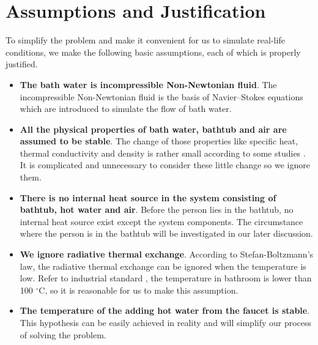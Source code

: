 \documentclass{mcmthesis}
\begin{document}
\section{Assumptions and Justification}

To simplify the problem and make it convenient for us to simulate real-life conditions, we make the following basic assumptions, each of which is properly justified.

\begin{itemize}[leftmargin=*]
\item {\bf The bath water is incompressible Non-Newtonian fluid}. The incompressible Non-Newtonian fluid is the basis of Navier–Stokes equations which are introduced to simulate the flow of bath water.

\item {\bf All the physical properties of bath water, bathtub and air are assumed to be stable}. The change of those properties like specific heat, thermal conductivity and density is rather small according to some studies . It is complicated and unnecessary to consider these little change so we ignore them.

\item {\bf There is no internal heat source in the system consisting of bathtub, hot water and air}. Before the person lies in the bathtub, no internal heat source exist except the system components. The circumstance where the person is in the bathtub will be investigated in our later discussion.

\item {\bf We ignore radiative thermal exchange}. According to Stefan-Boltzmann’s law, the radiative thermal exchange can be ignored when the temperature is low. Refer to industrial standard , the temperature in bathroom is lower than 100 $^{\circ}$C, so it is reasonable for us to make this assumption.

\item {\bf The temperature of the adding hot water from the faucet is stable}. This hypothesis can be easily achieved in reality and will simplify our process of solving the problem.
\end{itemize}
\end{document}
